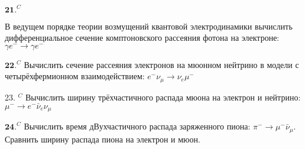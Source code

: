\documentclass[a4paper,12pt]{article} %
\begin{document}
\begin{ttask} $\mathbf{2 1 .}^{C}$ 

В ведущем порядке теории возмущений квантовой электродинамики 
вычислить дифференциальное сечение комптоновского рассеяния фотона на электроне: $\gamma e^{-} \rightarrow \gamma e^{-}$























\end{ttask}



\begin{ttask}

$\mathbf{2 2 .}^{C}$ Вычислить сечение рассеяния электронов на мюонном нейтрино
в модели с четырёхфермионном взаимодействием: $e^{-} \nu_{\mu} \rightarrow \nu_{e} \mu^{-}$




































\end{ttask}



\begin{ttask}

23. $^{C}$ Вычислить ширину трёхчастичного распада мюона на электрон и нейтрино: $\mu^{-} \rightarrow e^{-} \bar{\nu}_{e} \nu_{\mu}$


\end{ttask}



\begin{ttask}

$\mathbf{2 4 .}^{C}$ Вычислить время дВухчастичного распада заряженного пиона:
$\pi^{-} \rightarrow \mu^{-} \bar{\nu}_{\mu} .$ Сравнить ширину распада пиона на электрон и мюон.



\end{ttask}
\end{document}
